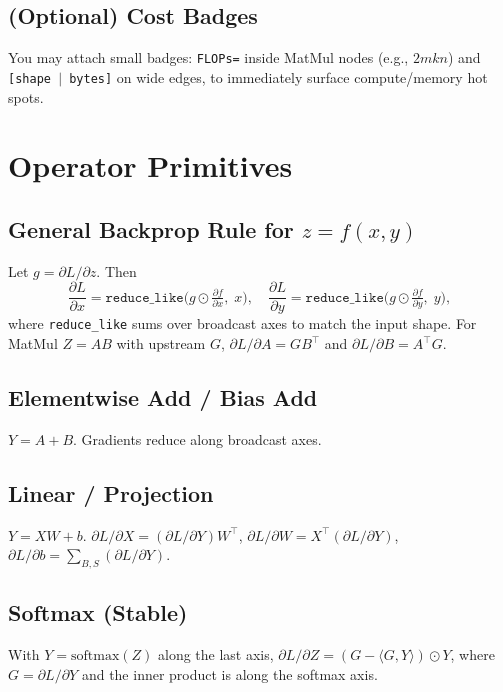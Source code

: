 \documentclass[10pt]{article}
\begin{document}
\subsection{(Optional) Cost Badges}
You may attach small badges: \texttt{FLOPs=} inside MatMul nodes (e.g., $2mkn$) and \texttt{[shape $|$ bytes]} on wide edges, to immediately surface compute/memory hot spots.


\section{Operator Primitives}
\subsection{General Backprop Rule for $z=f(x,y)$}
Let $g = \partial L/\partial z$. Then
\begin{equation}
\frac{\partial L}{\partial x} = \texttt{reduce\_like}\big(g\odot \tfrac{\partial f}{\partial x},\; x\big),\quad
\frac{\partial L}{\partial y} = \texttt{reduce\_like}\big(g\odot \tfrac{\partial f}{\partial y},\; y\big),
\end{equation}
where \texttt{reduce\_like} sums over broadcast axes to match the input shape. For MatMul $Z=AB$ with upstream $G$, $\partial L/\partial A=GB^{\top}$ and $\partial L/\partial B=A^{\top}G$.

\subsection{Elementwise Add / Bias Add}
$Y=A+B$. Gradients reduce along broadcast axes.

\subsection{Linear / Projection}
$Y= XW + b$. $\partial L/\partial X=(\partial L/\partial Y)W^{\top}$, $\partial L/\partial W=X^{\top}(\partial L/\partial Y)$, $\partial L/\partial b=\sum\limits_{B,S}(\partial L/\partial Y)$.

\subsection{Softmax (Stable)}
With $Y=\text{softmax}(Z)$ along the last axis, $\partial L/\partial Z=(G-\langle G,Y\rangle)\odot Y$, where $G=\partial L/\partial Y$ and the inner product is along the softmax axis.
\end{document}
